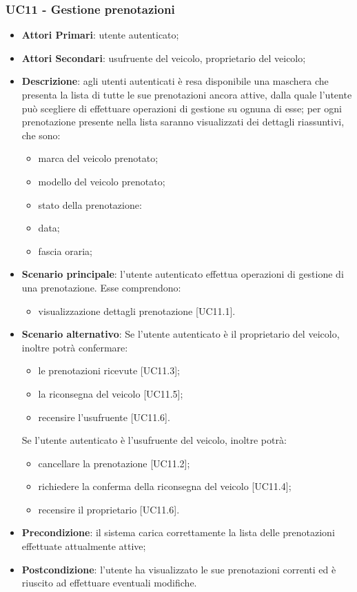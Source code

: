 \subsubsection{UC11 - Gestione prenotazioni}
\begin{itemize}
	\item \textbf{Attori Primari}: utente autenticato;
	\item \textbf{Attori Secondari}:
	usufruente del veicolo, proprietario del veicolo;
	\item \textbf{Descrizione}: agli utenti autenticati è resa disponibile una maschera che presenta la lista di tutte le sue prenotazioni ancora attive, dalla quale l'utente può scegliere di effettuare operazioni di gestione su ognuna di esse;
	per ogni prenotazione presente nella lista saranno visualizzati dei dettagli riassuntivi, che sono:
	\begin{itemize}
		\item marca del veicolo prenotato;
		\item modello del veicolo prenotato;
		\item stato della prenotazione:
		\item data;
		\item fascia oraria;
	\end{itemize}
	\item \textbf{Scenario principale}: l'utente autenticato effettua operazioni di gestione di una prenotazione. Esse comprendono:
	\begin{itemize}
		\item visualizzazione dettagli prenotazione [UC11.1].
	\end{itemize}
	\item \textbf{Scenario alternativo}: Se l'utente autenticato è il proprietario del veicolo, inoltre potrà confermare:
	\begin{itemize}
		\item le prenotazioni ricevute [UC11.3];
		\item la riconsegna del veicolo [UC11.5];
		\item recensire l'usufruente [UC11.6].
	\end{itemize}
	Se l'utente autenticato è l'usufruente del veicolo, inoltre potrà:
	\begin{itemize}
		\item cancellare la prenotazione [UC11.2];
		\item richiedere la conferma della riconsegna del veicolo [UC11.4];
		\item recensire il proprietario [UC11.6].
	\end{itemize}
	\item \textbf{Precondizione}: il sistema carica correttamente la lista delle prenotazioni effettuate attualmente attive;
	\item \textbf{Postcondizione}: l'utente ha visualizzato le sue prenotazioni correnti ed è riuscito ad effettuare eventuali modifiche.
\end{itemize} 
